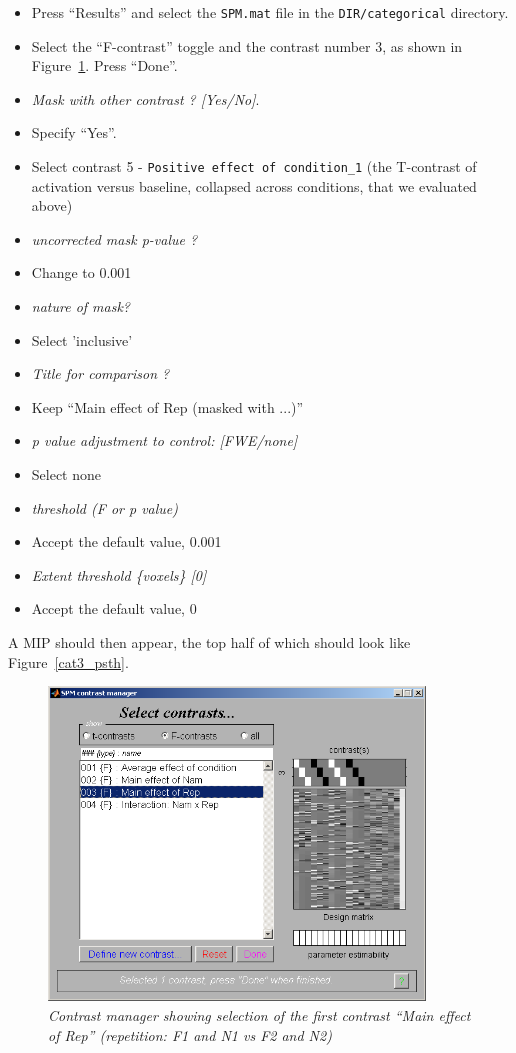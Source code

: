 \begin{itemize}
\item Press ``Results'' and select the \texttt{SPM.mat} file in the \texttt{DIR/categorical} directory.
\item Select the ``F-contrast'' toggle and the contrast number 3, as shown in Figure~\ref{cat3_contrast}. Press ``Done''.
\item \emph{Mask with other contrast ? [Yes/No]}.
\item Specify ``Yes''.
\item Select contrast 5 - \texttt{Positive effect of condition\_1} (the T-contrast of activation versus baseline, collapsed across conditions, that we evaluated above)
\item \emph{uncorrected mask p-value ?}
\item Change to 0.001
\item \emph{nature of mask?}
\item Select 'inclusive'
\item \emph{Title for comparison ?}
\item Keep ``Main effect of Rep (masked with ...)''
\item \emph{p value adjustment to control: [FWE/none]}
\item Select none
\item \emph{threshold (F or p value)}
\item Accept the default value, 0.001
\item \emph{Extent threshold \{voxels\} [0]}
\item Accept the default value, 0
\end{itemize}

A MIP should then appear, the top half of which should look like Figure~\ref{cat3_psth}.

\begin{figure}
\begin{center}
\includegraphics[width=100mm]{faces/cat3_contrast}
\caption{\em Contrast manager showing selection of the first contrast ``Main effect of Rep'' (repetition: F1 and N1 vs F2 and N2)\label{cat3_contrast} }
\end{center}
\end{figure}

